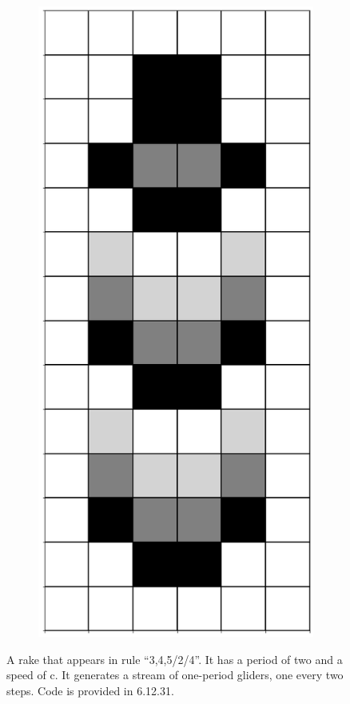 \documentclass[12pt]{article}
\numberwithin{figure}{section} %
\begin{document}
\begin{figure}[H]
\begin{subfigure}{0.18\textwidth}
     	\subcaption{}
   	\end{subfigure}
	\begin{subfigure}{0.18\textwidth}
     	\centering
     	\includegraphics[width=\linewidth]{Section4/34.4}
     	\subcaption{}
   	\end{subfigure}
   \caption{A rake that appears in rule “3,4,5/2/4”. It has a period of two and a speed of c. It generates a stream of one-period gliders, one every two steps. Code is provided in 6.12.31. }
      \vspace{-1.5em}
\end{figure}
\end{document}
